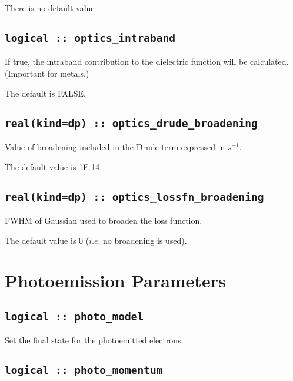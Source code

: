 \documentclass[a4paper,11pt,twoside]{book}
\begin{document}
There is no default value

\subsection[optics\_intraband]{\tt logical :: optics\_intraband}
If true, the intraband contribution to the dielectric function will be calculated.  (Important for metals.)    

The default is FALSE.

\subsection[optics\_drude\_broadening]{\tt real(kind=dp) :: optics\_drude\_broadening}
Value of broadening included in the Drude term expressed in $s^{-1}$.  

The default value is 1E-14.  

\subsection[optics\_lossfn\_broadening]{\tt real(kind=dp) :: optics\_lossfn\_broadening}
FWHM of Gaussian used to broaden the loss function.  

The default value is 0 ($i.e.$ no broadening is used).  

\section{Photoemission Parameters}

\subsection[photo\_model]{\tt logical :: photo\_model}

Set the final state for the photoemitted electrons.


\subsection[photo\_momentum]{\tt logical :: photo\_momentum}
\end{document}
